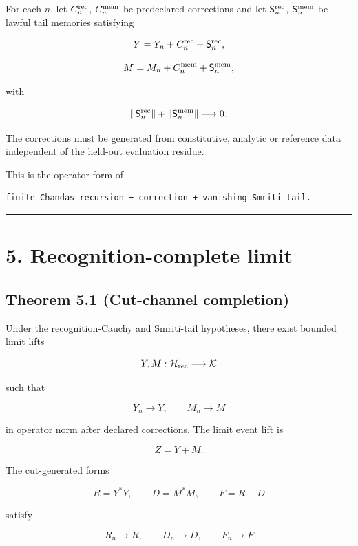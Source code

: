 For each \(n\), let \(C_n^{\rm rec}\), \(C_n^{\rm mem}\) be predeclared
corrections and let \(\mathsf S_n^{\rm rec}\), \(\mathsf S_n^{\rm mem}\) be
lawful tail memories satisfying

\[
Y=
Y_n+C_n^{\rm rec}+\mathsf S_n^{\rm rec},
\]

\[
M=
M_n+C_n^{\rm mem}+\mathsf S_n^{\rm mem},
\]

with

\[
\|\mathsf S_n^{\rm rec}\|
+\|\mathsf S_n^{\rm mem}\|
\longrightarrow0.
\]

The corrections must be generated from constitutive, analytic or reference data
independent of the held-out evaluation residue.

This is the operator form of

\begin{verbatim}
finite Chandas recursion + correction + vanishing Smriti tail.
\end{verbatim}

\begin{center}\rule{0.5\linewidth}{0.5pt}\end{center}

\hypertarget{recognition-complete-limit}{%
\section{5. Recognition-complete limit}\label{recognition-complete-limit}}

\hypertarget{theorem-5.1-cut-channel-completion}{%
\subsection{Theorem 5.1 (Cut-channel completion)}\label{theorem-5.1-cut-channel-completion}}

Under the recognition-Cauchy and Smriti-tail hypotheses, there exist bounded
limit lifts

\[
Y,M:\mathcal H_{\rm rec}\longrightarrow\mathcal K
\]

such that

\[
Y_n\longrightarrow Y,
\qquad
M_n\longrightarrow M
\]

in operator norm after declared corrections. The limit event lift is

\[
Z=Y+M.
\]

The cut-generated forms

\[
R=Y^*Y,
\qquad
D=M^*M,
\qquad
F=R-D
\]

satisfy

\[
R_n\longrightarrow R,
\qquad
D_n\longrightarrow D,
\qquad
F_n\longrightarrow F
\]

